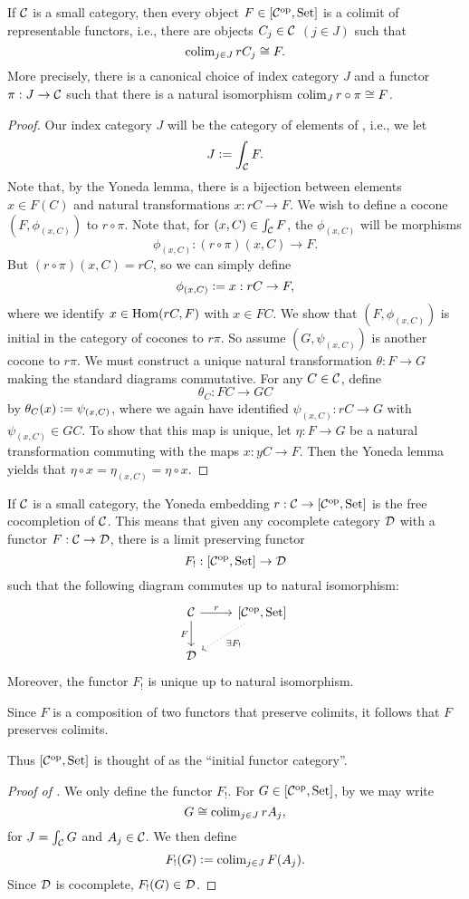 \begin{proposition}\label{colim-rep}
If $\mathcal{C}$ is a small category, then every object $F\in[\mathcal{C}^{\mathrm{op}},\mathrm{Set}]$ is a colimit of representable functors, i.e., there are objects $C_j\in\mathcal{C}$ $(j\in J)$ such that
\[
\operatorname{colim}_{j\in J}rC_j\cong F.
\]More precisely, there is a canonical choice of index category $J$ and a functor $\pi:J\to\mathcal{C}$ such that there is a natural isomorphism $\operatorname{colim}_J r\circ\pi \cong F$.
\end{proposition}

\begin{proof}
Our index category $J$ will be the category of elements of , i.e., we let
\[J\vcentcolon=\int_{\mathcal{C}} F.\]
Note that, by the Yoneda lemma, there is a bijection between elements $x\in F(C)$ and natural transformations $x:rC\to F$. We wish to define a cocone $(F,\phi_{(x,C)})$ to $r\circ\pi$. Note that, for $(x,C)\in\int_{\mathcal{C}} F$, the $\phi_{(x,C)}$ will be morphisms
\[
\phi_{(x,C)}:(r\circ\pi)(x,C)\to F.
\]But $(r\circ\pi)(x,C)=rC$, so we can simply define
\[
\phi_{(x,C)}\vcentcolon= x:rC\to F,
\]where we identify $x\in\operatorname{Hom}(rC,F)$ with $x\in FC$. We show that $(F,\phi_{(x,C)})$ is initial in the category of cocones to $r\pi$. So assume $(G,\psi_{(x,C)})$ is another cocone to $r\pi$. We must construct a unique natural transformation $\theta\colon F\to G$ making the standard diagrams commutative. For any $C\in\mathcal{C}$, define
\[\theta_C:FC\to GC
\]by $\theta_C(x)\vcentcolon=\psi_{(x,C)}$, where we again have identified $\psi_{(x,C)}:rC\to G$ with $\psi_{(x,C)}\in GC$. To show that this map is unique, let $\eta:F\to G$ be a natural transformation commuting with the maps $x:yC\to F$. Then the Yoneda lemma yields that $\eta\circ x=\eta_{(x,C)}=\eta\circ x$.
\end{proof}

\begin{proposition}\label{initial}
If $\mathcal{C}$ is a small category, the Yoneda embedding $r:\mathcal{C}\to[\mathcal{C}^{\mathrm{op}},\mathrm{Set}]$ is the free cocompletion of $\mathcal{C}$. This means that given any cocomplete category $\mathcal{D}$ with a functor $F:\mathcal{C}\to\mathcal{D}$, there is a limit preserving functor
\[
F_!:[\mathcal{C}^{\mathrm{op}},\mathrm{Set}]\to\mathcal{D}
\]such that the following diagram commutes up to natural isomorphism:
\[\begin{tikzcd}
\calC\arrow{r}{r}\arrow{d}[swap]{F} & \left[\calC^\op,\Set\right]\arrow[dotted]{ld}{\exists F_!}\\
\calD &\end{tikzcd}\]
Moreover, the functor $F_!$ is unique up to natural isomorphism.
\end{proposition}
\begin{remark}
Since $F$ is a composition of two functors that preserve colimits, it follows that $F$ preserves colimits.
\end{remark}
Thus $[\mathcal{C}^{\mathrm{op}},\mathrm{Set}]$ is thought of as the ``initial functor category''.

\begin{proof}[Proof of ]
We only define the functor $F_!$. For $G\in[\mathcal{C}^{\mathrm{op}},\mathrm{Set}]$, by  we may write
\[
G\cong\operatorname{colim}_{j\in J}rA_j,
\]for $J=\int_{\mathcal{C}} G$ and $A_j\in\mathcal{C}$. We then define
\[
F_!(G)\vcentcolon=\operatorname{colim}_{j\in J} F(A_j).
\]Since $\mathcal{D}$ is cocomplete, $F_!(G)\in\mathcal{D}$.
\end{proof}